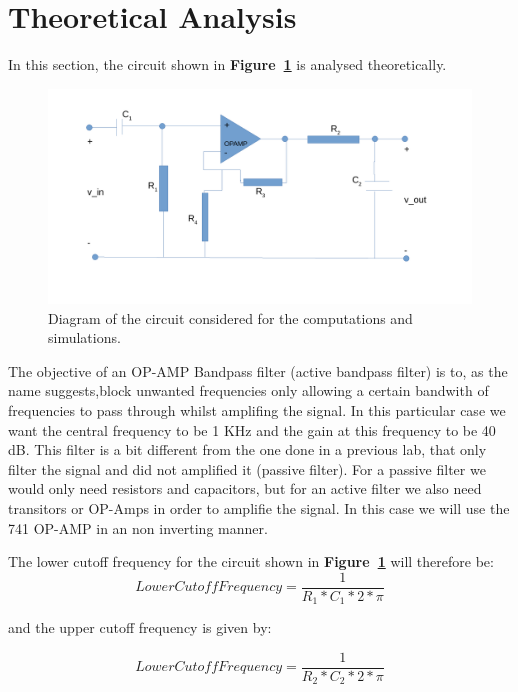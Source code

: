 \section{Theoretical Analysis}
\label{sec:analysis}

In this section, the circuit shown in \textbf{Figure~\ref{fig:diagram_t5}} is analysed
theoretically.
\begin{figure}[h] \centering
\includegraphics[width=0.95\linewidth]{diagram_t5.pdf}
\caption{Diagram of the circuit considered for the computations and simulations.}
\label{fig:diagram_t5}
\end{figure}


The objective of an OP-AMP Bandpass filter (active bandpass filter) is to, as the name suggests,block unwanted frequencies only allowing a certain bandwith of frequencies to pass through whilst amplifing the signal. In this particular case we want  the central frequency to be 1 KHz and the gain at this frequency to be 40 dB. This filter is a bit different from the one done in a previous lab, that only filter the signal and did not amplified it (passive filter). For  a passive filter we would only need resistors and capacitors, but for an active filter we also need transitors or OP-Amps in order to amplifie the signal. In this case we will use the 741 OP-AMP in an non inverting manner.\par 


The lower cutoff frequency for the circuit shown in \textbf{Figure~\ref{fig:diagram_t5}} will therefore be:
\begin {equation}
	Lower Cutoff Frequency= \frac{1}{R_1*C_1*2*\pi}   
	\label{eq:lcf}
\end{equation}


and the upper cutoff frequency is given by: 

\begin {equation}
	Lower Cutoff Frequency= \frac{1}{R_2 *C_2* 2*\pi}  
	\label{eq:ucf}
\end{equation}

